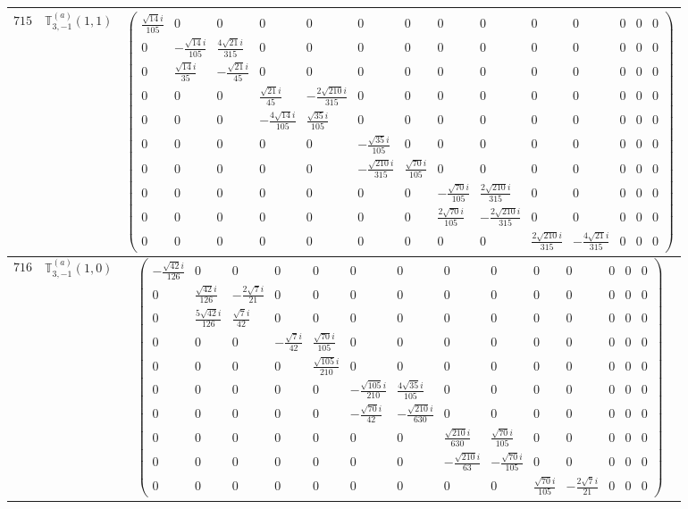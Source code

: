 \documentclass[fleqn,8pt,landscape]{jsarticle}
\begin{document}
\begin{center}
\begin{longtable}{ccc}
$ 715 $ & $ \mathbb{T}_{3,-1}^{(a)}(1,1) $ & $ \begin{pmatrix} \frac{\sqrt{14} i}{105} & 0 & 0 & 0 & 0 & 0 & 0 & 0 & 0 & 0 & 0 & 0 & 0 & 0 \\ 0 & - \frac{\sqrt{14} i}{105} & \frac{4 \sqrt{21} i}{315} & 0 & 0 & 0 & 0 & 0 & 0 & 0 & 0 & 0 & 0 & 0 \\ 0 & \frac{\sqrt{14} i}{35} & - \frac{\sqrt{21} i}{45} & 0 & 0 & 0 & 0 & 0 & 0 & 0 & 0 & 0 & 0 & 0 \\ 0 & 0 & 0 & \frac{\sqrt{21} i}{45} & - \frac{2 \sqrt{210} i}{315} & 0 & 0 & 0 & 0 & 0 & 0 & 0 & 0 & 0 \\ 0 & 0 & 0 & - \frac{4 \sqrt{14} i}{105} & \frac{\sqrt{35} i}{105} & 0 & 0 & 0 & 0 & 0 & 0 & 0 & 0 & 0 \\ 0 & 0 & 0 & 0 & 0 & - \frac{\sqrt{35} i}{105} & 0 & 0 & 0 & 0 & 0 & 0 & 0 & 0 \\ 0 & 0 & 0 & 0 & 0 & - \frac{\sqrt{210} i}{315} & \frac{\sqrt{70} i}{105} & 0 & 0 & 0 & 0 & 0 & 0 & 0 \\ 0 & 0 & 0 & 0 & 0 & 0 & 0 & - \frac{\sqrt{70} i}{105} & \frac{2 \sqrt{210} i}{315} & 0 & 0 & 0 & 0 & 0 \\ 0 & 0 & 0 & 0 & 0 & 0 & 0 & \frac{2 \sqrt{70} i}{105} & - \frac{2 \sqrt{210} i}{315} & 0 & 0 & 0 & 0 & 0 \\ 0 & 0 & 0 & 0 & 0 & 0 & 0 & 0 & 0 & \frac{2 \sqrt{210} i}{315} & - \frac{4 \sqrt{21} i}{315} & 0 & 0 & 0 \end{pmatrix} $ \\ \hline
$ 716 $ & $ \mathbb{T}_{3,-1}^{(a)}(1,0) $ & $ \begin{pmatrix} - \frac{\sqrt{42} i}{126} & 0 & 0 & 0 & 0 & 0 & 0 & 0 & 0 & 0 & 0 & 0 & 0 & 0 \\ 0 & \frac{\sqrt{42} i}{126} & - \frac{2 \sqrt{7} i}{21} & 0 & 0 & 0 & 0 & 0 & 0 & 0 & 0 & 0 & 0 & 0 \\ 0 & \frac{5 \sqrt{42} i}{126} & \frac{\sqrt{7} i}{42} & 0 & 0 & 0 & 0 & 0 & 0 & 0 & 0 & 0 & 0 & 0 \\ 0 & 0 & 0 & - \frac{\sqrt{7} i}{42} & \frac{\sqrt{70} i}{105} & 0 & 0 & 0 & 0 & 0 & 0 & 0 & 0 & 0 \\ 0 & 0 & 0 & 0 & \frac{\sqrt{105} i}{210} & 0 & 0 & 0 & 0 & 0 & 0 & 0 & 0 & 0 \\ 0 & 0 & 0 & 0 & 0 & - \frac{\sqrt{105} i}{210} & \frac{4 \sqrt{35} i}{105} & 0 & 0 & 0 & 0 & 0 & 0 & 0 \\ 0 & 0 & 0 & 0 & 0 & - \frac{\sqrt{70} i}{42} & - \frac{\sqrt{210} i}{630} & 0 & 0 & 0 & 0 & 0 & 0 & 0 \\ 0 & 0 & 0 & 0 & 0 & 0 & 0 & \frac{\sqrt{210} i}{630} & \frac{\sqrt{70} i}{105} & 0 & 0 & 0 & 0 & 0 \\ 0 & 0 & 0 & 0 & 0 & 0 & 0 & - \frac{\sqrt{210} i}{63} & - \frac{\sqrt{70} i}{105} & 0 & 0 & 0 & 0 & 0 \\ 0 & 0 & 0 & 0 & 0 & 0 & 0 & 0 & 0 & \frac{\sqrt{70} i}{105} & - \frac{2 \sqrt{7} i}{21} & 0 & 0 & 0 \end{pmatrix} $ \\ \hline

\end{longtable}
\end{center}
\end{document}
